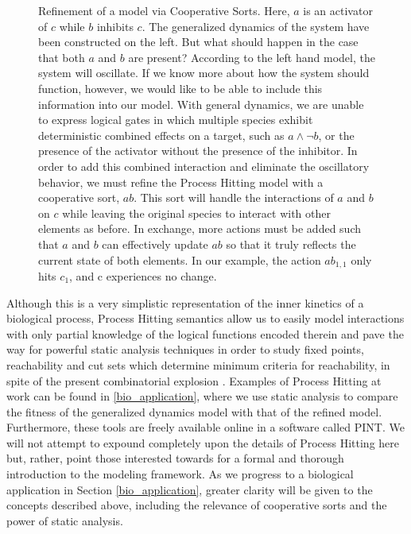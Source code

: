 \documentclass{article}
\begin{document}
\begin{figure}[h]
\begin{subfigure}[b]{0.55\textwidth}
\end{subfigure}
\caption{Refinement of a model via Cooperative Sorts. Here, $a$ is an activator of $c$ while $b$ inhibits $c$. The generalized dynamics of the system have been constructed on the left. But what should happen in the case that both $a$ and $b$ are present? According to the left hand model, the system will oscillate. If we know more about how the system should function, however, we would like to be able to include this information into our model. With general dynamics, we are unable to express logical gates in which multiple species exhibit deterministic combined effects on a target, such as $a\wedge \neg b$, or the presence of the activator without the presence of the inhibitor. In order to add this combined interaction and eliminate the oscillatory behavior, we must refine the Process Hitting model with a cooperative sort, $ab$. This sort will handle the interactions of $a$ and $b$ on $c$ while leaving the original species to interact with other elements as before. In exchange, more actions must be added such that $a$ and $b$ can effectively update $ab$ so that it truly reflects the current state of both elements. In our example, the action  $ab_{1,1}$ only hits $c_1$, and c experiences no change. }
\label{PH_coop}
\end{figure}

Although this is a very simplistic representation of the inner kinetics of a biological process, Process Hitting semantics allow us to easily model interactions with only partial knowledge of the logical functions encoded therein and pave the way for powerful static analysis techniques in order to study fixed points, reachability and cut sets which determine minimum criteria for reachability, in spite of the present combinatorial explosion \cite{FPMR13-CS2Bio, PMR10-TCSB}. Examples of Process Hitting at work can be found in \ref{bio_application}, where we use static analysis to compare the fitness of the generalized dynamics model with that of the refined model. Furthermore, these tools are freely available online in a software called PINT. We will not attempt to expound completely upon the details of Process Hitting here but, rather, point those interested towards \cite{PMR10-TCSB} for a formal and thorough introduction to the modeling framework. As we progress to a biological application in Section \ref{bio_application}, greater clarity will be given to the concepts described above, including the relevance of cooperative sorts and the power of static analysis.
\end{document}
